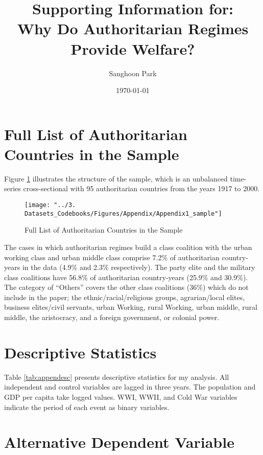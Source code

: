 \documentclass[12pt]{article}
\title{Supporting Information for: \\ Why Do Authoritarian Regimes Provide Welfare?}
\author{Sanghoon Park}
\date{\today}
\begin{document}
	\maketitle
	\tableofcontents
	
	\newpage
	
	\section{Full List of Authoritarian Countries in the Sample}
	Figure \ref{fig:figure6} illustrates the structure of the sample, which is an unbalanced time-series cross-sectional with 95 authoritarian countries from the years 1917 to 2000. 
	\begin{figure}[!ht]
		\centering
		\texttt{[image: "../3. Datasets\_Codebooks/Figures/Appendix/Appendix1\_sample"]}
		\caption{Full List of Authoritarian Countries in the Sample}
		\label{fig:figure6}
	\end{figure}
	The cases in which authoritarian regimes build a class coalition with the urban working class and urban middle class comprise 7.2\% of authoritarian country-years in the data (4.9\% and 2.3\% respectively). The party elite and the military class coalitions have 56.8\% of authoritarian country-years (25.9\% and 30.9\%). The category of ``Others'' covers the other class coalitions (36\%) which do not include in the paper; the ethnic/racial/religious groups, agrarian/local elites, business elites/civil servants, urban Working, rural Working, urban middle, rural middle, the aristocracy, and a foreign government, or colonial power. 
	
	\section{Descriptive Statistics}
	
	Table \ref{tab:appendesc} presents descriptive statistics for my analysis. All independent and control variables are lagged in three years. The population and GDP per capita take logged values. WWI, WWII, and Cold War variables indicate the period of each event as binary variables. 
	
	
	
	\section{Alternative Dependent Variable}
\end{document}
